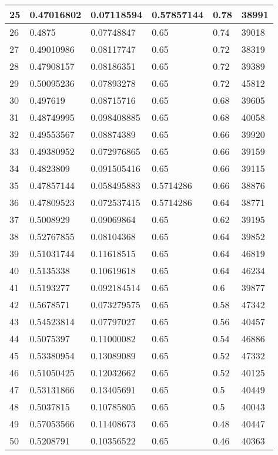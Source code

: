 \begin{longtable}{|l|l|l|l|l|l|}
25 & 0.47016802 & 0.07118594 & 0.57857144 & 0.78 & 38991 \\ \hline 
26 & 0.4875 & 0.07748847 & 0.65 & 0.74 & 39018 \\ \hline 
27 & 0.49010986 & 0.08117747 & 0.65 & 0.72 & 38319 \\ \hline 
28 & 0.47908157 & 0.08186351 & 0.65 & 0.72 & 39389 \\ \hline 
29 & 0.50095236 & 0.07893278 & 0.65 & 0.72 & 45812 \\ \hline 
30 & 0.497619 & 0.08715716 & 0.65 & 0.68 & 39605 \\ \hline 
31 & 0.48749995 & 0.098408885 & 0.65 & 0.68 & 40058 \\ \hline 
32 & 0.49553567 & 0.08874389 & 0.65 & 0.66 & 39920 \\ \hline 
33 & 0.49380952 & 0.072976865 & 0.65 & 0.66 & 39159 \\ \hline 
34 & 0.4823809 & 0.091505416 & 0.65 & 0.66 & 39115 \\ \hline 
35 & 0.47857144 & 0.058495883 & 0.5714286 & 0.66 & 38876 \\ \hline 
36 & 0.47809523 & 0.072537415 & 0.5714286 & 0.64 & 38771 \\ \hline 
37 & 0.5008929 & 0.09069864 & 0.65 & 0.62 & 39195 \\ \hline 
38 & 0.52767855 & 0.08104368 & 0.65 & 0.64 & 39852 \\ \hline 
39 & 0.51031744 & 0.11618515 & 0.65 & 0.64 & 46819 \\ \hline 
40 & 0.5135338 & 0.10619618 & 0.65 & 0.64 & 46234 \\ \hline 
41 & 0.5193277 & 0.092184514 & 0.65 & 0.6 & 39877 \\ \hline 
42 & 0.5678571 & 0.073279575 & 0.65 & 0.58 & 47342 \\ \hline 
43 & 0.54523814 & 0.07797027 & 0.65 & 0.56 & 40457 \\ \hline 
44 & 0.5075397 & 0.11000082 & 0.65 & 0.54 & 46886 \\ \hline 
45 & 0.53380954 & 0.13089089 & 0.65 & 0.52 & 47332 \\ \hline 
46 & 0.51050425 & 0.12032662 & 0.65 & 0.52 & 40125 \\ \hline 
47 & 0.53131866 & 0.13405691 & 0.65 & 0.5 & 40449 \\ \hline 
48 & 0.5037815 & 0.10785805 & 0.65 & 0.5 & 40043 \\ \hline 
49 & 0.57053566 & 0.11408673 & 0.65 & 0.48 & 40447 \\ \hline 
50 & 0.5208791 & 0.10356522 & 0.65 & 0.46 & 40363 \\ \hline 
\end{longtable}
